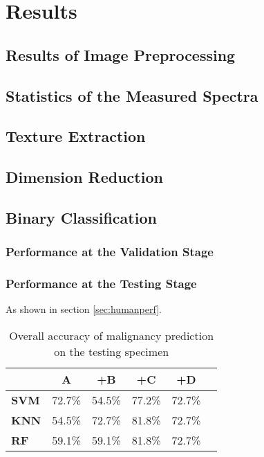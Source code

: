\chapter{Results}


\section{Results of Image Preprocessing}
\blindtext

\section{Statistics of the Measured Spectra}
\blindtext

\section{Texture Extraction}
\blindtext

\section{Dimension Reduction}
\blindtext


\section{Binary Classification}
\subsection{Performance at the Validation Stage}
\blindtext

\subsection{Performance at the Testing Stage}
\blindtext
As shown in section \ref{sec:humanperf}.

\begin{table}[H]
\centering
\caption{Overall accuracy of malignancy prediction on the testing specimen }
\label{tabl:testacc}
	\begin{tabular}{lc c c c c} 
 		\toprule
 		& \textbf{A} & \textbf{+B} & \textbf{+C} & \textbf{+D} \\[0.5ex] 
 		\midrule
 		\textbf{SVM}  & 72.7\% & 54.5\% & 77.2\% & 72.7\% \\
 		\textbf{KNN}  & 54.5\% & 72.7\%  & 81.8\% & 72.7\%  \\
 		 \textbf{RF}  & 59.1\% & 59.1\% & 81.8\% & 72.7\% \\
 		\bottomrule
	\end{tabular}
\end{table}

